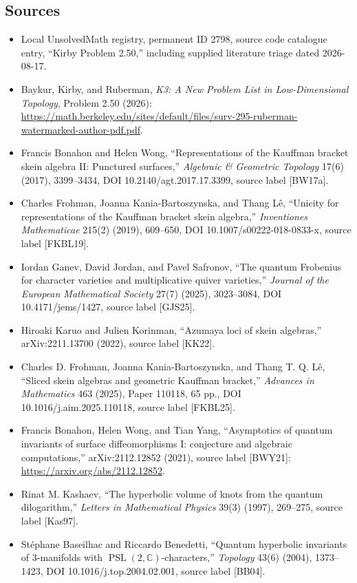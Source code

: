\documentclass[11pt]{article}
\newcommand{\C}{\mathbb{C}}
\begin{document}
\subsection{Sources}
\begin{itemize}
\item Local UnsolvedMath registry, permanent ID 2798, source code catalogue entry, ``Kirby Problem 2.50,'' including supplied literature triage dated 2026-08-17.
\item Baykur, Kirby, and Ruberman, \emph{K3: A New Problem List in Low-Dimensional Topology}, Problem 2.50 (2026): \url{https://math.berkeley.edu/sites/default/files/surv-295-ruberman-watermarked-author-pdf.pdf}.
\item Francis Bonahon and Helen Wong, ``Representations of the Kauffman bracket skein algebra II: Punctured surfaces,'' \emph{Algebraic \& Geometric Topology} 17(6) (2017), 3399--3434, DOI 10.2140/agt.2017.17.3399, source label [BW17a].
\item Charles Frohman, Joanna Kania-Bartoszynska, and Thang L\^e, ``Unicity for representations of the Kauffman bracket skein algebra,'' \emph{Inventiones Mathematicae} 215(2) (2019), 609--650, DOI 10.1007/s00222-018-0833-x, source label [FKBL19].
\item Iordan Ganev, David Jordan, and Pavel Safronov, ``The quantum Frobenius for character varieties and multiplicative quiver varieties,'' \emph{Journal of the European Mathematical Society} 27(7) (2025), 3023--3084, DOI 10.4171/jems/1427, source label [GJS25].
\item Hiroaki Karuo and Julien Korinman, ``Azumaya loci of skein algebras,'' arXiv:2211.13700 (2022), source label [KK22].
\item Charles D. Frohman, Joanna Kania-Bartoszynska, and Thang T. Q. L\^e, ``Sliced skein algebras and geometric Kauffman bracket,'' \emph{Advances in Mathematics} 463 (2025), Paper 110118, 65 pp., DOI 10.1016/j.aim.2025.110118, source label [FKBL25].
\item Francis Bonahon, Helen Wong, and Tian Yang, ``Asymptotics of quantum invariants of surface diffeomorphisms I: conjecture and algebraic computations,'' arXiv:2112.12852 (2021), source label [BWY21]: \url{https://arxiv.org/abs/2112.12852}.
\item Rinat M. Kashaev, ``The hyperbolic volume of knots from the quantum dilogarithm,'' \emph{Letters in Mathematical Physics} 39(3) (1997), 269--275, source label [Kas97].
\item St\'ephane Baseilhac and Riccardo Benedetti, ``Quantum hyperbolic invariants of 3-manifolds with \(\operatorname{PSL}(2,\C)\)-characters,'' \emph{Topology} 43(6) (2004), 1373--1423, DOI 10.1016/j.top.2004.02.001, source label [BB04].

\end{itemize}
\end{document}
